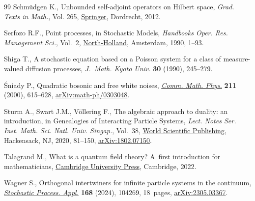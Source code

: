\begin{thebibliography}{99}
Schm\"udgen K., Unbounded self-adjoint operators on Hilbert space,
 \textit{Grad. Texts in Math.}, Vol. 265, \href{https://doi.org/10.1007/978-94-007-4753-1}{Springer}, Dordrecht, 2012.

Serfozo R.F., Point processes, in Stochastic Models, \textit{Handbooks Oper.
 Res. Management Sci.}, Vol.~2, \href{https://doi.org/10.1016/S0927-0507(05)80165-3}{North-Holland}, Amsterdam, 1990, 1--93.

Shiga T., A stochastic equation based on a {P}oisson system for a class of
 measure-valued diffusion processes, \href{https://doi.org/10.1215/kjm/1250520071}{\textit{J.~Math. Kyoto Univ.}} \textbf{30}
 (1990), 245--279.

\'Sniady P., Quadratic bosonic and free white noises, \href{https://doi.org/10.1007/s002200050828}{\textit{Comm. Math.
 Phys.}} \textbf{211} (2000), 615--628, \href{https://arxiv.org/abs/math-ph/0303048}{arXiv:math-ph/0303048}.

Sturm A., Swart J.M., V\"ollering F., The algebraic approach to duality: an
 introduction, in Genealogies of Interacting Particle Systems, \textit{Lect.
 Notes Ser. Inst. Math. Sci. Natl. Univ. Singap.}, Vol.~38, \href{https://doi.org/10.1142/9789811206092_0003}{World Scientific
 Publishing}, Hackensack, NJ, 2020, 81--150, \href{https://arxiv.org/abs/1802.07150}{arXiv:1802.07150}.

Talagrand M., What is a quantum field theory? {A}~first introduction for
 mathematicians, \href{https://doi.org/10.1017/9781108225144}{Cambridge University Press}, Cambridge, 2022.

Wagner S., Orthogonal intertwiners for infinite particle systems in the
 continuum, \href{https://doi.org/10.1016/j.spa.2023.104269}{\textit{Stochastic Process. Appl.}} \textbf{168} (2024), 104269,
 18~pages, \href{https://arxiv.org/abs/2305.03367}{arXiv:2305.03367}.

\end{thebibliography}
